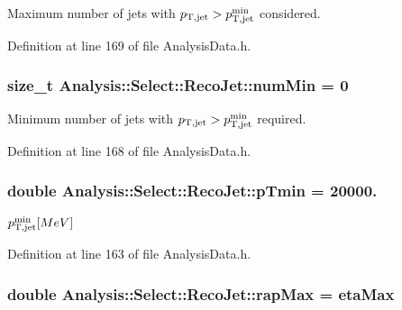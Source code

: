 Maximum number of jets with $ p_{\rm T,jet} > p_{\rm T,jet}^{\rm min} $ considered. 



Definition at line 169 of file Analysis\+Data.\+h.

\subsubsection[{\texorpdfstring{num\+Min}{numMin}}]{\setlength{\rightskip}{0pt plus 5cm}size\+\_\+t Analysis\+::\+Select\+::\+Reco\+Jet\+::num\+Min = 0\hspace{0.3cm}{\ttfamily [static]}}\hypertarget{namespaceAnalysis_1_1Select_1_1RecoJet_a66b9735f564115b3ac0b7a823291b689}{}\label{namespaceAnalysis_1_1Select_1_1RecoJet_a66b9735f564115b3ac0b7a823291b689}


Minimum number of jets with $ p_{\rm T,jet} > p_{\rm T,jet}^{\rm min} $ required. 



Definition at line 168 of file Analysis\+Data.\+h.

\subsubsection[{\texorpdfstring{p\+Tmin}{pTmin}}]{\setlength{\rightskip}{0pt plus 5cm}double Analysis\+::\+Select\+::\+Reco\+Jet\+::p\+Tmin = 20000.\hspace{0.3cm}{\ttfamily [static]}}\hypertarget{namespaceAnalysis_1_1Select_1_1RecoJet_af7dbdbda43aa5be9d83a31fc3b41ac14}{}\label{namespaceAnalysis_1_1Select_1_1RecoJet_af7dbdbda43aa5be9d83a31fc3b41ac14}


$ p_{\rm T,jet}^{\rm min} [MeV] $ 



Definition at line 163 of file Analysis\+Data.\+h.

\subsubsection[{\texorpdfstring{rap\+Max}{rapMax}}]{\setlength{\rightskip}{0pt plus 5cm}double Analysis\+::\+Select\+::\+Reco\+Jet\+::rap\+Max = {\bf eta\+Max}\hspace{0.3cm}{\ttfamily [static]}}\hypertarget{namespaceAnalysis_1_1Select_1_1RecoJet_ada7395a2f03291db87208b68e4030d92}{}\label{namespaceAnalysis_1_1Select_1_1RecoJet_ada7395a2f03291db87208b68e4030d92}


